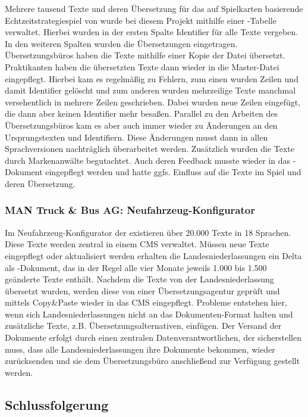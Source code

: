 Mehrere tausend Texte und deren Übersetzung für das auf Spielkarten basierende Echtzeitstrategiespiel  von  wurde bei diesem Projekt mithilfe einer -Tabelle verwaltet. Hierbei wurden in der ersten Spalte Identifier für alle Texte vergeben. In den weiteren Spalten wurden die Übersetzungen eingetragen. Übersetzungsbüros haben die Texte mithilfe einer Kopie der Datei übersetzt. Praktikanten haben die übersetzten Texte dann wieder in die Master-Datei eingepflegt. Hierbei kam es regelmäßig zu Fehlern, zum einen wurden Zeilen und damit Identifier gelöscht und zum anderen wurden mehrzeilige Texte manchmal versehentlich in mehrere Zeilen geschrieben. Dabei wurden neue Zeilen eingefügt, die dann aber keinen Identifier mehr besaßen. Parallel zu den Arbeiten des Übersetzungsbüros kam es aber auch immer wieder zu Änderungen an den Ursprungstexten und Identifiern. Diese Änderungen musst dann in allen Sprachversionen nachträglich überarbeitet werden. Zusätzlich wurden die Texte durch Markenanwälte begutachtet. Auch deren Feedback musste wieder in das -Dokument eingepflegt werden und hatte ggfs. Einfluss auf die Texte im Spiel und deren Übersetzung.

\subsubsection{MAN Truck \& Bus AG: Neufahrzeug-Konfigurator}

Im Neufahrzeug-Konfigurator der  existieren über 20.000 Texte in 18 Sprachen. Diese Texte werden zentral in einem CMS verwaltet. Müssen neue Texte eingepflegt oder aktualisiert werden erhalten die Landesniederlassungen ein Delta als -Dokument, das in der Regel alle vier Monate jeweils 1.000 bis 1.500 geänderte Texte enthält. Nachdem die Texte von der Landesniederlassung übersetzt wurden, werden diese von einer Übersetzungsagentur geprüft und mittels Copy\&Paste wieder in das CMS eingepflegt.  Probleme entstehen hier, wenn sich Landesniederlassungen nicht an das Dokumenten-Format halten und zusätzliche Texte, z.B. Übersetzungsalternativen, einfügen. Der Versand der Dokumente erfolgt durch einen zentralen Datenverantwortlichen, der sicherstellen muss, dass alle Landesniederlassungen ihre Dokumente bekommen, wieder zurücksenden und sie dem Übersetzungsbüro anschließend zur Verfügung gestellt werden.

\pagebreak

\subsection{Schlussfolgerung}\label{l:schlussfolgerung}

